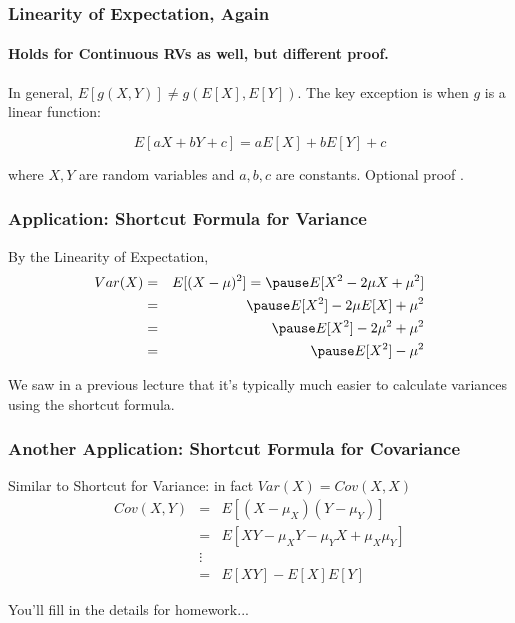 \documentclass[handout]{beamer}
\begin{document}
\begin{frame}
\frametitle{Linearity of Expectation, Again}
\framesubtitle{Holds for Continuous RVs as well, but different proof.}
In general, $E[g(X,Y)]\neq g(E[X],E[Y])$. The key exception is when $g$ is a linear function:

\Large
$$\boxed{E[aX + bY + c] = aE[X] + bE[Y] + c}$$

\normalsize
where $X,Y$ are random variables and $a,b,c$ are constants.
Optional proof \textcolor{blue}{\href{http://ditraglia.com/Econ103Public/OptionalProofs.pdf}{}}.
\end{frame}

\begin{frame}
\frametitle{Application: Shortcut Formula for Variance}

By the Linearity of Expectation, 
\begin{eqnarray*}
	Var(X) &=&  E[(X - \mu)^2] = \pause E[X^2 - 2\mu X + \mu^2]\\
		&=& \pause E[X^2] - 2\mu E[X] + \mu^2\\
		&=& \pause E[X^2] - 2\mu^2 + \mu^2\\
		&=& \pause E[X^2] - \mu^2
\end{eqnarray*}

\alert{We saw in a previous lecture that it's typically much easier to calculate variances using the shortcut formula.}

\end{frame}


\begin{frame}
\frametitle{Another Application: Shortcut Formula for Covariance}
\alert{Similar to Shortcut for Variance: in fact $Var(X) = Cov(X,X)$}
\begin{eqnarray*}
	Cov(X,Y)&=& E[(X - \mu_X)(Y-\mu_Y)]\\
			&=& E[XY - \mu_X Y - \mu_Y X + \mu_X \mu_Y]\\
			&\vdots& \\
			&=& E[XY] - E[X]E[Y]
\end{eqnarray*}

\hfill \alert{You'll fill in the details for homework...}
\end{frame}
\end{document}
